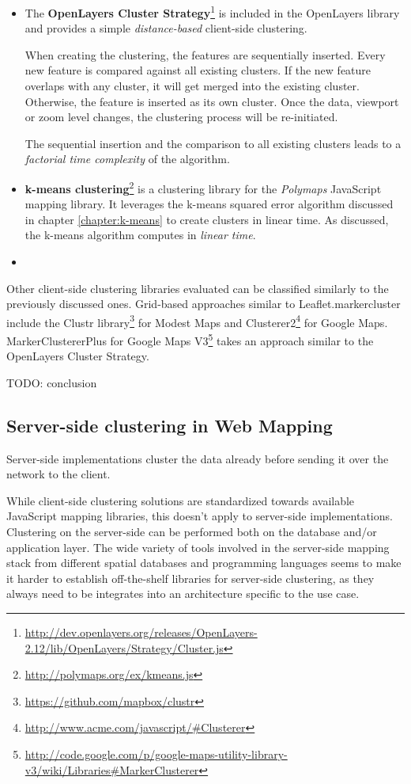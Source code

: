 \begin{itemize}
\item The \textbf{OpenLayers Cluster Strategy}\footnote{\url{http://dev.openlayers.org/releases/OpenLayers-2.12/lib/OpenLayers/Strategy/Cluster.js}} is included in the OpenLayers library and provides a simple \textit{distance-based} client-side clustering.

When creating the clustering, the features are sequentially inserted. Every new feature is compared against all existing clusters. If the new feature overlaps with any cluster, it will get merged into the existing cluster. Otherwise, the feature is inserted as its own cluster. Once the data, viewport or zoom level changes, the clustering process will be re-initiated. 

The sequential insertion and the comparison to all existing clusters leads to a \textit{factorial time complexity} of the algorithm. 

\item \textbf{k-means clustering}\footnote{\url{http://polymaps.org/ex/kmeans.js}} is a clustering library for the \textit{Polymaps} JavaScript mapping library. It leverages the k-means squared error algorithm discussed in chapter \ref{chapter:k-means} to create clusters in linear time. As discussed, the k-means algorithm computes in \textit{linear time}.

\item 
\end{itemize}

Other client-side clustering libraries evaluated can be classified similarly to the previously discussed ones. Grid-based approaches similar to Leaflet.markercluster include the Clustr library\footnote{\url{https://github.com/mapbox/clustr}} for Modest Maps and Clusterer2\footnote{\url{http://www.acme.com/javascript/\#Clusterer}} for Google Maps. MarkerClustererPlus for Google Maps V3\footnote{\url{http://code.google.com/p/google-maps-utility-library-v3/wiki/Libraries\#MarkerClusterer}} takes an approach similar to the OpenLayers Cluster Strategy.

TODO: conclusion

\subsection{Server-side clustering in Web Mapping}

Server-side implementations cluster the data already before sending it over the network to the client.

While client-side clustering solutions are standardized towards available JavaScript mapping libraries, this doesn't apply to server-side implementations. Clustering on the server-side can be performed both on the database and/or application layer. The wide variety of tools involved in the server-side mapping stack from different spatial databases and programming languages seems to make it harder to establish off-the-shelf libraries for server-side clustering, as they always need to be integrates into an architecture specific to the use case.



